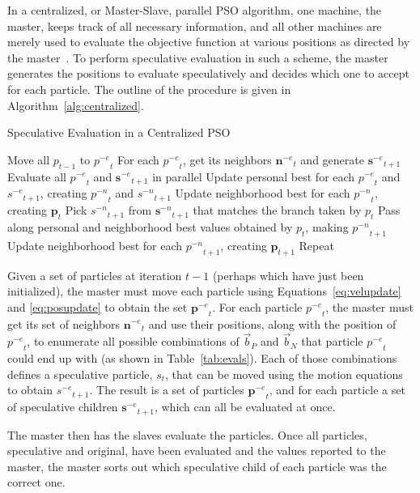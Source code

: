 \documentclass[oneside,honors]{honors}
\newcommand{\alg}[1]{Algorithm~\ref{alg:#1}}
\providecommand{\nbest}{\ensuremath{\Vec{b}_N}}
\providecommand{\pbest}{\ensuremath{\Vec{b}_P}}
\providecommand{\noeval}[1]{\ensuremath{#1^{-e}}}
\providecommand{\nonbest}[1]{\ensuremath{#1^{-n}}}
\providecommand{\p}{\ensuremath{p}}
\providecommand{\pset}{\ensuremath{\mathbf{p}}}
\providecommand{\s}{\ensuremath{s}}
\providecommand{\sset}{\ensuremath{\mathbf{s}}}
\providecommand{\nset}{\ensuremath{\mathbf{n}}}
\begin{document}
In a centralized, or Master-Slave, parallel PSO algorithm, one machine, the
master, keeps track of all necessary information, and all other machines are
merely used to evaluate the objective function at various positions as directed
by the master~\cite{belal-ijicis04}.  To perform speculative evaluation in such
a scheme, the master generates the positions to evaluate speculatively and
decides which one to accept for each particle.  The outline of the procedure is
given in \alg{centralized}.

\begin{algorithm}
  \caption{Speculative Evaluation in a Centralized PSO}
  \label{alg:centralized}
  \begin{algorithmic}[1]
	\STATE Move all $\p_{t-1}$ to $\noeval{\p}_t$
	\STATE For each $\noeval{\p}_t$, get its neighbors $\noeval{\nset}_t$ and
	  generate $\noeval{\sset}_{t+1}$
	\STATE Evaluate all $\noeval{\p}_t$ and $\noeval{\sset}_{t+1}$ in parallel
	\STATE Update personal best for each $\noeval{\p}_t$ and
	  $\noeval{\s}_{t+1}$, creating $\nonbest{\p}_t$ and $\nonbest{\s}_{t+1}$
	\STATE Update neighborhood best for each $\nonbest{\p}_t$, creating
	  $\pset_t$
	\FORALL{$\p_t$}
	\STATE Pick $\nonbest{\s}_{t+1}$ from $\nonbest{\sset}_{t+1}$ that matches
	  the branch taken by $\p_t$
	\STATE Pass along personal and neighborhood best values obtained by $\p_t$,
	  making $\nonbest{\p}_{t+1}$
	\ENDFOR
	\STATE Update neighborhood best for each $\nonbest{\p}_{t+1}$, creating
	  $\pset_{t+1}$
	\STATE Repeat
  \end{algorithmic}
\end{algorithm}

Given a set of particles at iteration $t-1$ (perhaps which have just been
initialized), the master must move each particle using
Equations~\eqref{eq:velupdate} and \eqref{eq:posupdate} to obtain the set
$\noeval{\pset}_t$.  For each particle $\noeval{\p}_t$, the master must get its
set of neighbors $\noeval{\nset}_t$ and use their positions, along with the
position of $\noeval{\p}_t$, to enumerate all possible combinations of $\pbest$
and $\nbest$ that particle $\noeval{\p}_t$ could end up with (as shown in
Table~\ref{tab:evals}).  Each of those combinations defines a speculative
particle, $\s_t$, that can be moved using the motion equations to obtain
$\noeval{\s}_{t+1}$.  The result is a set of particles $\noeval{\pset}_t$, and
for each particle a set of speculative children $\noeval{\sset}_{t+1}$, which
can all be evaluated at once.

The master then has the slaves evaluate the particles.  Once all particles,
speculative and original, have been evaluated and the values reported to the
master, the master sorts out which speculative child of each particle was the
correct one.
\end{document}
